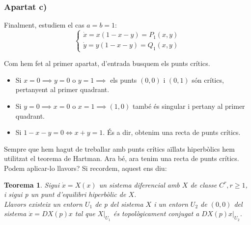 \documentclass{article}
\newtheorem{thm}{Teorema}
\begin{document}
\subsubsection*{Apartat c)}

Finalment, estudiem el cas $a=b=1$:
\begin{equation}
  \begin{cases}
    \dot{x}=x(1-x-y) = P_1(x,y) \\
    \dot{y}=y(1-x-y) = Q_1(x,y)
  \end{cases}
\end{equation}

\noindent Com hem fet al primer apartat, d'entrada busquem els punts crítics. 
\begin{itemize}
  \item Si $x=0 \implies y=0$ o $y=1 \implies$ els punts $(0,0)$ i $(0,1)$ són crítics, pertanyent al primer quadrant.
  \item Si $y=0 \implies x=0$ o $x=1 \implies (1,0)$ també és singular i pertany al primer quadrant.
  \item Si $1-x-y=0 \iff x+y=1$. És a dir, obtenim una recta de punts crítics.
\end{itemize} %

\noindent Sempre que hem hagut de treballar amb punts crítics aïllats hiperbòlics hem utilitzat el teorema de Hartman. Ara bé, ara tenim una recta de punts crítics. Podem aplicar-lo llavors? Si recordem, aquest ens diu:
\begin{thm}
  Sigui $\dot{x}=X(x)$ un sistema diferencial amb $X$ de classe $C^r, r\geq1$, i sigui p un punt d'equilibri hiperbòlic de $X$. \\
  Llavors existeix un entorn $U_1$ de p del sistema $X$ i un entorn $U_2$ de $(0,0)$ del sistema $\dot{x}=DX(p)x$ tal que $X|_{U_1}$ és topològicament conjugat a $DX(p)x|_{U_2}$.
\end{thm}
\end{document}
